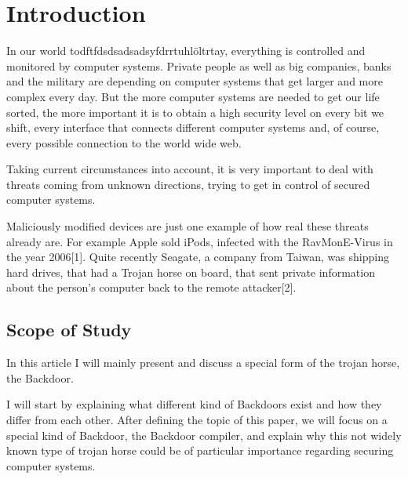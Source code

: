 \documentclass[a4paper, 12pt]{article}
\begin{document}
\newpage


\tableofcontents
\newpage


\section{Introduction}


In our world todftfdsdsadsadsyfdrrtuhlöltrtay, everything is controlled and monitored by computer systems. Private people as well as big companies, banks and the military are depending on computer systems that get larger and more complex every day.
But the more computer systems are needed to get our life sorted, the more important it is to obtain a high security level on every bit we shift, every interface that connects different computer systems and, of course, every possible connection to the world wide web.

Taking current circumstances into account, it is very important to deal with threats coming from unknown directions, trying to get in control of secured computer systems.

Maliciously modified devices are just one example of how real these threats already are. For example Apple sold iPods, infected with the RavMonE-Virus in the year 2006[1]. Quite recently Seagate, a company from Taiwan, was shipping hard drives, that had a Trojan horse on board, that sent private information about the person's computer back to the remote attacker[2].


\subsection{Scope of Study}

In this article I will mainly present and discuss a special form of the trojan horse, the Backdoor.

I will start by explaining what different kind of Backdoors exist and how they differ from each other.
After defining the topic of this paper, we will focus on a special kind of Backdoor, the Backdoor compiler, and explain why this not widely known type of trojan horse could be of particular importance regarding securing computer systems.
\end{document}
